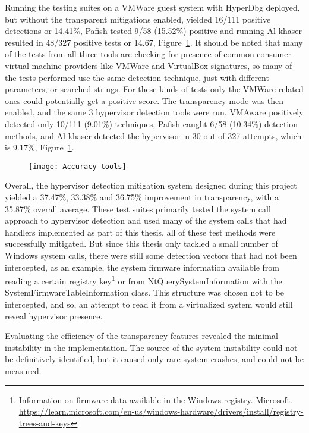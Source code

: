 Running the testing suites on a VMWare guest system with HyperDbg deployed, but without the transparent mitigations enabled, yielded 16/111 positive detections or 14.41\%, 
Pafish tested 9/58 (15.52\%) positive and running Al-khaser resulted in 48/327 positive tests or 14.67, Figure~\ref{fig:test_accuracy}.
It should be noted that many of the tests from all three tools are checking for presence of common consumer virtual machine providers like VMWare and VirtualBox signatures, 
so many of the tests performed use the same detection technique, just with different parameters, or searched strings. For these kinds of tests only the VMWare related ones could potentially get a positive score. 
The transparency mode was then enabled, and the same 3 hypervisor detection tools were run. VMAware positively detected only 10/111 (9.01\%) techniques, Pafish caught 6/58 (10.34\%) detection methods, and 
Al-khaser detected the hypervisor in 30 out of 327 attempts, which is 9.17\%, Figure~\ref{fig:test_accuracy}.
\begin{figure}[tbp]
    \texttt{[image: Accuracy tools]} %
    \label{fig:test_accuracy}
\end{figure}

Overall, the hypervisor detection mitigation system designed during this project yielded a 37.47\%, 33.38\% and 36.75\% improvement in transparency, 
with a 35.87\% overall average. These test suites primarily tested the system call approach to hypervisor detection and used many of the system calls that had handlers implemented as part of this thesis, 
all of these test methods were successfully mitigated. But since this thesis only tackled a small number of Windows system calls, there were still some detection vectors that had not been intercepted, 
as an example, the system firmware information available from reading a certain registry key\footnote{Information on firmware data available in the Windows registry. Microsoft. \url{https://learn.microsoft.com/en-us/windows-hardware/drivers/install/registry-trees-and-keys}} 
or from NtQuerySystemInformation with the SystemFirmwareTableInformation class. This structure was chosen not to be intercepted, and so, 
an attempt to read it from a virtualized system would still reveal hypervisor presence.

Evaluating the efficiency of the transparency features revealed the minimal instability in the implementation. The source of the system instability 
could not be definitively identified, but it caused only rare system crashes, and could not be measured.


